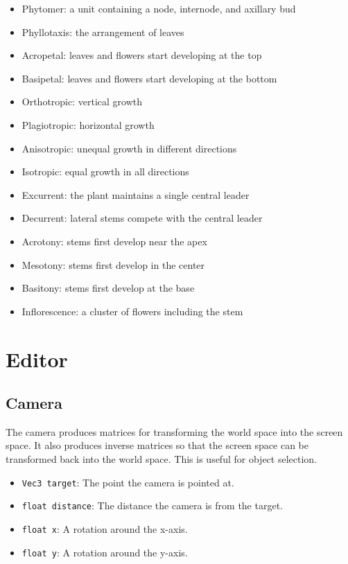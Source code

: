 \documentclass[10pt]{article}
\begin{document}
\begin{itemize}
\item Phytomer: a unit containing a node, internode, and axillary bud
\item Phyllotaxis: the arrangement of leaves
\item Acropetal: leaves and flowers start developing at the top
\item Basipetal: leaves and flowers start developing at the bottom
\item Orthotropic: vertical growth
\item Plagiotropic: horizontal growth
\item Anisotropic: unequal growth in different directions
\item Isotropic: equal growth in all directions
\item Excurrent: the plant maintains a single central leader
\item Decurrent: lateral stems compete with the central leader
\item Acrotony: stems first develop near the apex
\item Mesotony: stems first develop in the center
\item Basitony: stems first develop at the base
\item Inflorescence: a cluster of flowers including the stem
\end{itemize}

\pagebreak
\section{Editor}

\subsection{Camera}

The camera produces matrices for transforming the world space into the screen space. It also produces inverse matrices so that the screen space can be transformed back into the world space. This is useful for object selection.
\begin{itemize}
\item \texttt{Vec3 target}: The point the camera is pointed at.
\item \texttt{float distance}: The distance the camera is from the target.
\item \texttt{float x}: A rotation around the x-axis.
\item \texttt{float y}: A rotation around the y-axis.
\end{itemize}
\end{document}

